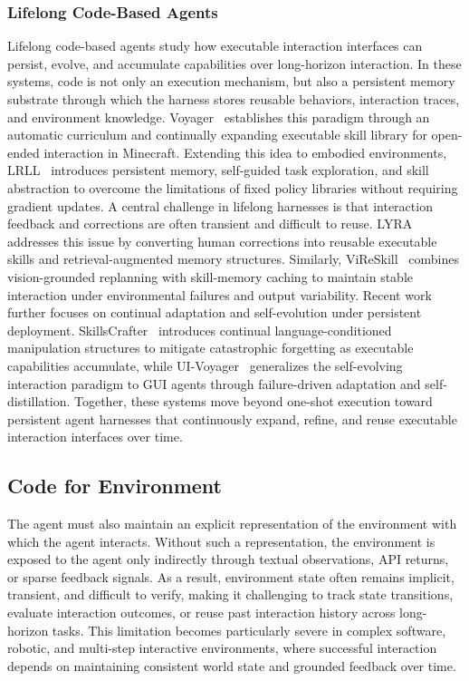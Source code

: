 \documentclass{llmxive}
\begin{document}
\subsubsection{Lifelong Code-Based Agents}
Lifelong code-based agents study how executable interaction
interfaces can persist, evolve, and accumulate capabilities over
long-horizon interaction.
In these systems, code is not only an execution mechanism, but
also a persistent memory substrate through which the harness
stores reusable behaviors, interaction traces, and environment
knowledge.
Voyager~\cite{wang2023voyager} establishes this paradigm through
an automatic curriculum and continually expanding executable
skill library for open-ended interaction in Minecraft.
Extending this idea to embodied environments,
LRLL~\cite{tziafas2024lifelong} introduces persistent memory,
self-guided task exploration, and skill abstraction to overcome
the limitations of fixed policy libraries without requiring
gradient updates.
A central challenge in lifelong harnesses is that interaction
feedback and corrections are often transient and difficult to
reuse.
LYRA~\cite{meng2025growing} addresses this issue by converting
human corrections into reusable executable skills and
retrieval-augmented memory structures.
Similarly, ViReSkill~\cite{kagaya2025vireskill} combines
vision-grounded replanning with skill-memory caching to maintain
stable interaction under environmental failures and output
variability.
Recent work further focuses on continual adaptation and
self-evolution under persistent deployment.
SkillsCrafter~\cite{wang2026lifelong} introduces continual
language-conditioned manipulation structures to mitigate
catastrophic forgetting as executable capabilities accumulate,
while UI-Voyager~\cite{lin2026ui} generalizes the self-evolving
interaction paradigm to GUI agents through failure-driven
adaptation and self-distillation.
Together, these systems move beyond one-shot execution toward
persistent agent harnesses that continuously expand, refine, and
reuse executable interaction interfaces over time.

\subsection{Code for Environment}
\label{subsec:environment}


The agent must also maintain an explicit representation
of the environment with which the agent interacts.
Without such a representation, the environment is exposed to the agent only indirectly through textual observations, API returns, or sparse feedback signals.
As a result, environment state often remains implicit, transient, and difficult to verify, making it challenging to
track state transitions, evaluate interaction outcomes, or reuse
past interaction history across long-horizon tasks.
This limitation becomes particularly severe in complex software,
robotic, and multi-step interactive environments, where
successful interaction depends on maintaining consistent world
state and grounded feedback over time.
\end{document}
